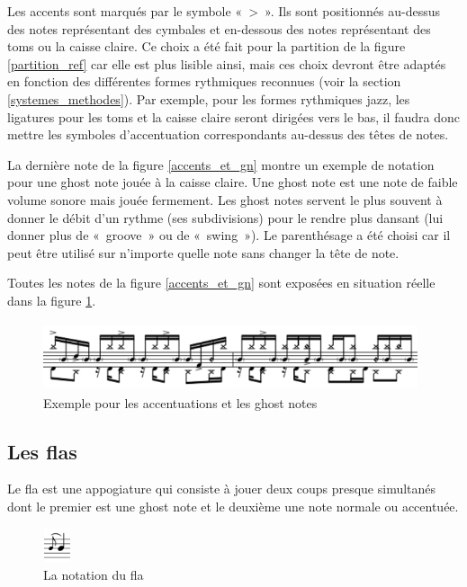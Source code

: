 Les accents sont marqués par le symbole «~>~». Ils sont positionnés au-dessus
des notes représentant des cymbales et en-dessous des notes représentant des
toms ou la caisse claire. Ce choix a été fait pour la partition de la figure
\ref{partition_ref} car elle est plus lisible ainsi, mais ces choix devront
être adaptés en fonction des différentes formes rythmiques reconnues
(voir la section \ref{systemes_methodes}). Par exemple, pour les
formes rythmiques jazz, les ligatures pour les toms et la caisse
claire seront dirigées vers le bas, il faudra donc mettre les symboles
d’accentuation correspondants au-dessus des têtes de notes.

La dernière note de la figure \ref{accents_et_gn} montre un exemple de notation
pour une ghost note jouée à la caisse claire. Une ghost note
\cite{lexique_drum} est une note de faible volume sonore mais jouée fermement.
Les ghost notes servent le plus souvent à donner le débit d’un rythme (ses
subdivisions) pour le rendre plus dansant (lui donner plus de «~groove~» ou de
«~swing~»). Le parenthésage a été choisi car il peut être utilisé sur n’importe
quelle note sans changer la tête de note.

Toutes les notes de la figure \ref{accents_et_gn} sont exposées en situation
réelle dans la figure \ref{exemple_acc_et_gn}. 
\begin{figure}[h]
\centering
\includegraphics[height=20mm, width=110mm]{
z_images/3_methodes/0_notation_de_la_batterie/8_accents_et_ghost-notes_1.png}
\caption{Exemple pour les accentuations et les ghost notes}
\label{exemple_acc_et_gn}
\end{figure}

\subsection*{Les flas}
Le fla est une appogiature qui consiste à jouer deux coups presque simultanés dont
le premier est une ghost note et le deuxième une note normale ou accentuée.
\begin{figure}[h]
    \centering
    \includegraphics[height=10mm, width=8mm]{
    z_images/3_methodes/0_notation_de_la_batterie/fla_def.png}
    \caption{La notation du fla}
\end{figure}

